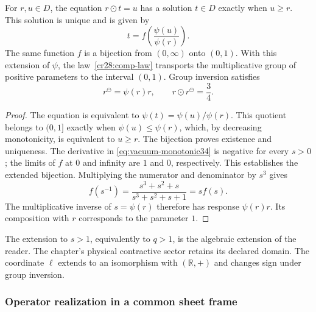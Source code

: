 \begin{proposition}
\label{cr28:comp-inverse}
For $r,u\in D$, the equation $r\odot t=u$ has a solution $t\in D$
exactly when $u\geq r$. This solution is unique and is given by
\begin{equation}
 t=f\!\left(\frac{\psi(u)}{\psi(r)}\right).
 \label{cr28:comp-cancellation}
\end{equation}
The same function $f$ is a bijection from $(0,\infty)$ onto $(0,1)$.
With this extension of $\psi$, the law~\eqref{cr28:comp-law} transports
the multiplicative group of positive parameters to the interval $(0,1)$.
Group inversion satisfies
\begin{equation}
 r^{\ominus}=\psi(r)r,\qquad
 r\odot r^{\ominus}=\frac34.
 \label{cr28:comp-group-inverse}
\end{equation}
\end{proposition}
\begin{proof}
The equation is equivalent to
$\psi(t)=\psi(u)/\psi(r)$. This quotient belongs to $(0,1]$ exactly
when $\psi(u)\leq\psi(r)$, which, by decreasing monotonicity, is
equivalent to $u\geq r$. The bijection proves existence and uniqueness.
The derivative in \eqref{eq:vacuum-monotonic34} is negative for every $s>0$;
the limits of $f$ at $0$ and infinity are $1$ and $0$, respectively.
This establishes the extended bijection. Multiplying the numerator and
denominator by $s^3$ gives
\[
 f(s^{-1})=\frac{s^3+s^2+s}{s^3+s^2+s+1}=s f(s).
\]
The multiplicative inverse of $s=\psi(r)$ therefore has response
$\psi(r)r$. Its composition with $r$ corresponds to the parameter $1$.
\end{proof}

The extension to $s>1$, equivalently to $q>1$, is the algebraic extension
of the reader. The chapter's physical contractive sector retains its
declared domain. The coordinate $\ell$ extends to an isomorphism with
$(\mathbb R,+)$ and changes sign under group inversion.

\subsubsection{Operator realization in a common sheet frame}

